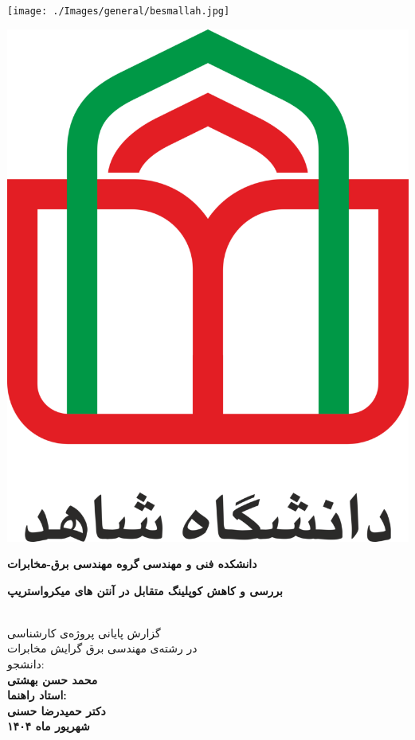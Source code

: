 
\newpage
\thispagestyle{empty}
\centerline{\texttt{[image: ./Images/general/besmallah.jpg]}}

\thispagestyle{empty}
\vspace*{-28mm}
\centerline{\includegraphics[scale=0.1]{./Images/general/logo.png}}
\begin{center}
\vspace{-1mm}
\textbf{دانشکده فنی و مهندسی}
\textbf{گروه مهندسی برق-مخابرات}
\\[3cm]
\begin{Huge}
\textbf{
بررسی و کاهش کوپلینگ متقابل در آنتن های میکرواستریپ
}
\end{Huge}
\\[1.5cm]
\Large
گزارش پایانی پروژه‌ی کارشناسی
\\[0.25cm]
در رشته‌ی مهندسی برق گرایش مخابرات
\\[3cm]
دانشجو:
\\[0.25cm]
\textbf{
محمد حسن بهشتی    
\\[1cm]
استاد راهنما:
\\[0.25cm]
دکتر حمیدرضا حسنی
\\[1cm]
شهریور ماه ۱۴۰۴
}
\end{center}

